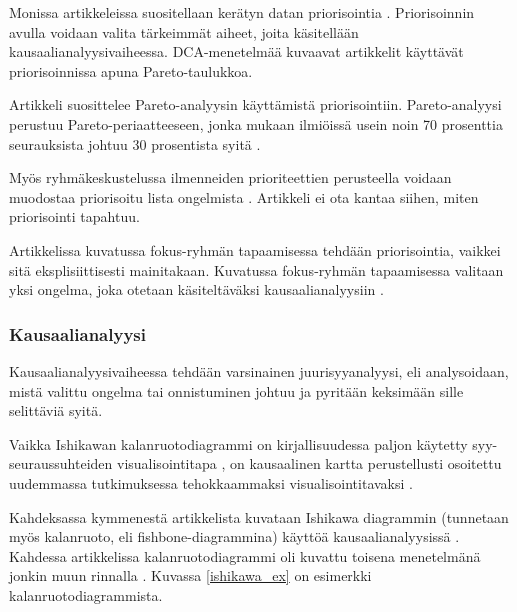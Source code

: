 Monissa artikkeleissa suositellaan kerätyn datan priorisointia \citep{card1998learning, birk2002postmortem, staalhane2003post, staalhane2004root, karlsson2006case}. Priorisoinnin avulla voidaan valita tärkeimmät aiheet, joita käsitellään kausaalianalyysivaiheessa. DCA-menetelmää kuvaavat artikkelit \citep{kalinowski2012evidence, card1998learning} käyttävät priorisoinnissa apuna Pareto-taulukkoa.

Artikkeli \citep{staalhane2004root} suosittelee Pareto-analyysin käyttämistä priorisointiin. Pareto-analyysi perustuu Pareto-periaatteeseen, jonka mukaan ilmiöissä usein noin 70 prosenttia seurauksista johtuu 30 prosentista syitä \citep{staalhane2004root}. 

Myös ryhmäkeskustelussa ilmenneiden prioriteettien perusteella voidaan muodostaa priorisoitu lista ongelmista \citep{staalhane2003post}. Artikkeli \citep{birk2002postmortem} ei ota kantaa siihen, miten priorisointi tapahtuu.

Artikkelissa \citep{Lehtinen2011} kuvatussa fokus-ryhmän tapaamisessa tehdään priorisointia, vaikkei sitä eksplisiittisesti mainitakaan. Kuvatussa fokus-ryhmän tapaamisessa valitaan yksi ongelma, joka otetaan käsiteltäväksi kausaalianalyysiin \citep{Lehtinen2011}.

\subsubsection{Kausaalianalyysi}
Kausaalianalyysivaiheessa tehdään varsinainen juurisyyanalyysi, eli analysoidaan, mistä valittu ongelma tai onnistuminen johtuu ja pyritään keksimään sille selittäviä syitä. 

Vaikka Ishikawan kalanruotodiagrammi \citep{ishikawa1990introduction} on kirjallisuudessa paljon käytetty syy-seuraussuhteiden visualisointitapa \citep{kalinowski2012evidence, Bjornson2009, de2004learning, staalhane2004root, dingsoyr2003extending, staalhane2003post, birk2002postmortem, card1998learning}, on kausaalinen kartta perustellusti osoitettu uudemmassa tutkimuksessa tehokkaammaksi visualisointitavaksi \citep{Bjornson2009, Lehtinen2011}. 

Kahdeksassa kymmenestä artikkelista kuvataan Ishikawa diagrammin (tunnetaan myös kalanruoto, eli fishbone-diagrammina) käyttöä kausaalianalyysissä \citep{kalinowski2012evidence, de2004learning, staalhane2004root, dingsoyr2003extending, birk2002postmortem, card1998learning}. Kahdessa artikkelissa kalanruotodiagrammi oli kuvattu toisena menetelmänä jonkin muun rinnalla \citep{Bjornson2009, staalhane2003post}. Kuvassa \ref{ishikawa_ex} on esimerkki kalanruotodiagrammista.

